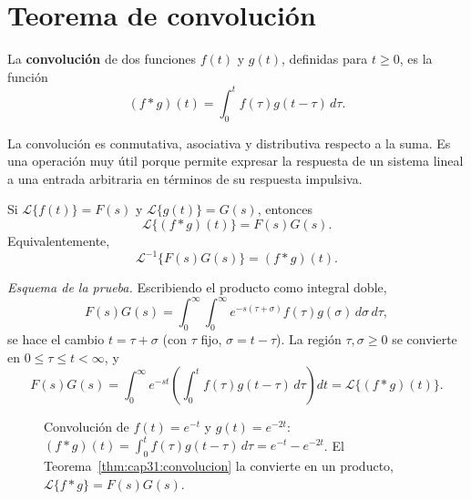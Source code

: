\section{Teorema de convolución}

\begin{definition}
La \textbf{convolución} de dos funciones $f(t)$ y $g(t)$, definidas para $t\ge0$, es la función
\[
(f * g)(t) = \int_0^t f(\tau) g(t-\tau)\,d\tau.
\]
\end{definition}

\begin{rem}
La convolución es conmutativa, asociativa y distributiva respecto a la suma. Es una operación muy útil porque permite expresar la respuesta de un sistema lineal a una entrada arbitraria en términos de su respuesta impulsiva.
\end{rem}

\begin{theorem}
\label{thm:cap31:convolucion}
Si $\mathcal{L}\{f(t)\}=F(s)$ y $\mathcal{L}\{g(t)\}=G(s)$, entonces
\[
\mathcal{L}\{(f * g)(t)\} = F(s) G(s).
\]
Equivalentemente,
\[
\mathcal{L}^{-1}\{F(s) G(s)\} = (f * g)(t).
\]
\end{theorem}

\begin{rem}
\emph{Esquema de la prueba.} Escribiendo el producto como integral doble,
\[
F(s)G(s)=\int_0^\infty\!\!\int_0^\infty e^{-s(\tau+\sigma)} f(\tau)g(\sigma)\,d\sigma\,d\tau,
\]
se hace el cambio $t=\tau+\sigma$ (con $\tau$ fijo, $\sigma=t-\tau$). La región $\tau,\sigma\ge0$ se convierte en $0\le\tau\le t<\infty$, y
\[
F(s)G(s)=\int_0^\infty e^{-st}\!\left(\int_0^t f(\tau)g(t-\tau)\,d\tau\right)dt=\mathcal L\{(f*g)(t)\}.
\]
\end{rem}

\begin{figure}[!htbp]
\centering
{}
\caption{Convolución de $f(t)=e^{-t}$ y $g(t)=e^{-2t}$: $(f*g)(t)=\int_0^t f(\tau)g(t-\tau)\,d\tau=e^{-t}-e^{-2t}$. El Teorema~\ref{thm:cap31:convolucion} la convierte en un producto, $\mathcal L\{f*g\}=F(s)G(s)$.}
\label{fig:convolucion}
\end{figure}

